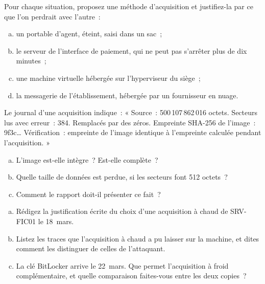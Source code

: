 \begin{boxexo}[title={\ding{45}\quad Exercice~3.2. Choisir la méthode \niveaumoyen}]
Pour chaque situation, proposez une méthode d'acquisition et justifiez-la
par ce que l'on perdrait avec l'autre~:
\begin{enumerate}[(a)]
    \item un portable d'agent, éteint, saisi dans un sac~;
    \item le serveur de l'interface de paiement, qui ne peut pas s'arrêter
          plus de dix minutes~;
    \item une machine virtuelle hébergée sur l'hyperviseur du siège~;
    \item la messagerie de l'établissement, hébergée par un fournisseur en
          nuage.
\end{enumerate}
\end{boxexo}

\begin{boxexo}[title={\ding{45}\quad Exercice~3.3. Lire un journal d'acquisition \niveaumoyen}]
Le journal d'une acquisition indique~: « Source~: 500\,107\,862\,016
octets. Secteurs lus avec erreur~: 384. Remplacés par des zéros. Empreinte
SHA-256 de l'image~: 9f3c\ldots{} Vérification~: empreinte de l'image
identique à l'empreinte calculée pendant l'acquisition. »
\begin{enumerate}[(a)]
    \item L'image est-elle intègre~? Est-elle complète~?
    \item Quelle taille de données est perdue, si les secteurs font 512
          octets~?
    \item Comment le rapport doit-il présenter ce fait~?
\end{enumerate}
\end{boxexo}

\begin{boxexo}[title={\ding{45}\quad Exercice~3.4. SRV-FIC01 à chaud \niveauexpert}]
\begin{enumerate}[(a)]
    \item Rédigez la justification écrite du choix d'une acquisition à chaud
          de SRV-FIC01 le 18~mars.
    \item Listez les traces que l'acquisition à chaud a pu laisser sur la
          machine, et dites comment les distinguer de celles de
          l'attaquant.
    \item La clé BitLocker arrive le 22~mars. Que permet l'acquisition à
          froid complémentaire, et quelle comparaison faites-vous entre les
          deux copies~?
\end{enumerate}
\end{boxexo}

